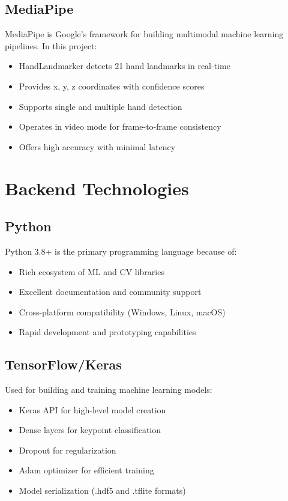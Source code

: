 \subsection{MediaPipe}

MediaPipe is Google's framework for building multimodal machine learning pipelines. In this project:
\begin{itemize}
    \item HandLandmarker detects 21 hand landmarks in real-time
    \item Provides x, y, z coordinates with confidence scores
    \item Supports single and multiple hand detection
    \item Operates in video mode for frame-to-frame consistency
    \item Offers high accuracy with minimal latency
\end{itemize}

\section{Backend Technologies}

\subsection{Python}

Python 3.8+ is the primary programming language because of:
\begin{itemize}
    \item Rich ecosystem of ML and CV libraries
    \item Excellent documentation and community support
    \item Cross-platform compatibility (Windows, Linux, macOS)
    \item Rapid development and prototyping capabilities
\end{itemize}

\subsection{TensorFlow/Keras}

Used for building and training machine learning models:
\begin{itemize}
    \item Keras API for high-level model creation
    \item Dense layers for keypoint classification
    \item Dropout for regularization
    \item Adam optimizer for efficient training
    \item Model serialization (.hdf5 and .tflite formats)
\end{itemize}

